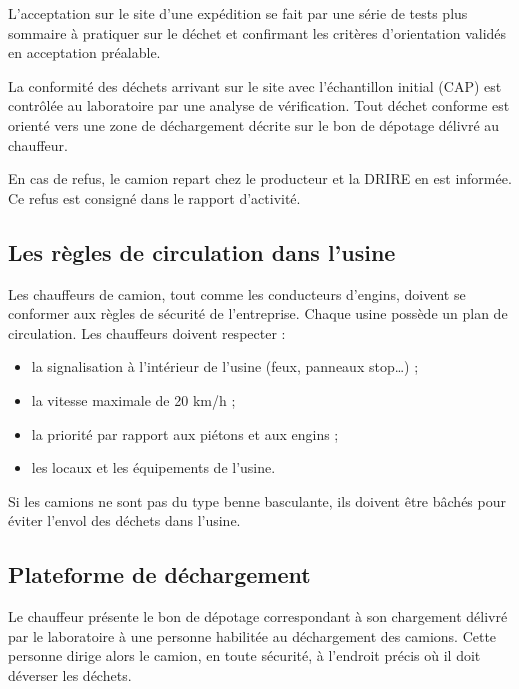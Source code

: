 L’acceptation sur le site d’une expédition se fait par une série de tests plus sommaire à pratiquer sur le déchet et confirmant les critères d’orientation validés en acceptation préalable.
\vspace{0.3cm}

La conformité des déchets arrivant sur le site avec l’échantillon initial (CAP) est contrôlée au laboratoire par une analyse de vérification.
Tout déchet conforme est orienté vers une zone de déchargement décrite sur le bon de dépotage délivré au chauffeur.
\vspace{0.3cm}

En cas de refus, le camion repart chez le producteur et la DRIRE en est informée. Ce refus est consigné dans le rapport d’activité.




\subsection{Les règles de circulation dans l’usine}

Les chauffeurs de camion, tout comme les conducteurs d’engins, doivent se conformer aux règles de sécurité de l’entreprise.
Chaque usine possède un plan de circulation.
Les chauffeurs doivent respecter :

\begin{itemize}
\item la signalisation à l’intérieur de l’usine (feux, panneaux stop…) ;
\item la vitesse maximale de 20 km/h ;
\item la priorité par rapport aux piétons et aux engins ;
\item les locaux et les équipements de l’usine.

\end{itemize}

Si les camions ne sont pas du type benne basculante, ils doivent être bâchés pour éviter l’envol des déchets dans l’usine.


\subsection{Plateforme de déchargement}

Le chauffeur présente le bon de dépotage correspondant à son chargement délivré par le laboratoire à une personne habilitée au déchargement des camions. Cette personne dirige alors le camion, en toute sécurité, à l’endroit précis où il doit déverser les déchets.
\vspace{0.3cm}

